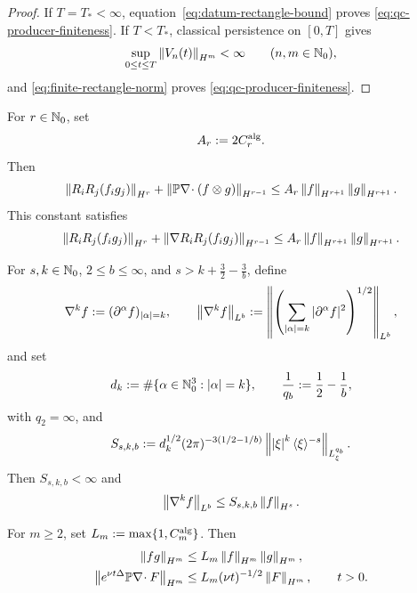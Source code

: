 \begin{proof}
If \(T=T_*<\infty\), equation~\eqref{eq:datum-rectangle-bound} proves
\eqref{eq:qc-producer-finiteness}.  If \(T<T_*\), classical persistence on
\([0,T]\) gives
\[
 \sup_{0\le t\le T}\left\lVert V_n(t)\right\rVert_{H^m}<\infty
 \qquad(n,m\in\mathbb N_0),
\]
and \eqref{eq:finite-rectangle-norm} proves
\eqref{eq:qc-producer-finiteness}.
\end{proof}

\begin{lemma}
\label{lem:qc-analytic-constants}
For \(r\in\mathbb N_0\), set
\[
 A_r:=2C_r^{\rm alg}.
\]
Then
\begin{equation}
 \left\lVert R_iR_j(f_i g_j)\right\rVert_{H^r}
 +\left\lVert \mathbb P\nabla\!\cdot(f\otimes g)\right\rVert_{H^{r-1}}
 \le A_r\left\lVert f\right\rVert_{H^{r+1}}\left\lVert g\right\rVert_{H^{r+1}}.
 \label{eq:qc-product-constant}
\end{equation}
This constant satisfies
\begin{equation}
 \left\lVert R_iR_j(f_i g_j)\right\rVert_{H^r}
 +\left\lVert \nabla R_iR_j(f_i g_j)\right\rVert_{H^{r-1}}
 \le A_r\left\lVert f\right\rVert_{H^{r+1}}\left\lVert g\right\rVert_{H^{r+1}}.
 \label{eq:qc-pressure-product-constant}
\end{equation}
\begin{samepage}
For \(s,k\in\mathbb N_0\), \(2\le b\le\infty\), and
\(s>k+\frac32-\frac3b\), define
\[
 \nabla^k f:=(\partial^\alpha f)_{|\alpha|=k},
 \qquad
 \left\lVert \nabla^k f\right\rVert_{L^b}
 :=\left\|\left(
   \sum_{|\alpha|=k}|\partial^\alpha f|^2
 \right)^{1/2}\right\|_{L^b},
\]
and set
\[
 d_k:=\#\{\alpha\in\mathbb N_0^3:\left|\alpha\right|=k\},
 \qquad
 \frac1{q_b}:=\frac12-\frac1b,
\]
with \(q_2=\infty\), and
\begin{equation}
 S_{s,k,b}:=
 d_k^{1/2}(2\pi)^{-3(1/2-1/b)}
 \left\lVert \left|\xi\right|^k\langle\xi\rangle^{-s}\right\rVert_{L^{q_b}_\xi}.
 \label{eq:qc-embedding-constant-definition}
\end{equation}
Then \(S_{s,k,b}<\infty\) and
\begin{equation}
 \left\lVert \nabla^k f\right\rVert_{L^b}\le S_{s,k,b}\left\lVert f\right\rVert_{H^s}.
 \label{eq:qc-embedding-constant}
\end{equation}
\par
\end{samepage}
For \(m\ge2\), set \(L_m:=\max\{1,C_m^{\rm alg}\}\).  Then
\begin{align}
 \left\lVert fg\right\rVert_{H^m}
 &\le L_m\left\lVert f\right\rVert_{H^m}\left\lVert g\right\rVert_{H^m},
 \label{eq:qc-algebra-constant}\\
 \left\lVert e^{\nu t\Delta}\mathbb P\nabla\!\cdot F\right\rVert_{H^m}
 &\le L_m(\nu t)^{-1/2}\left\lVert F\right\rVert_{H^m},
 \qquad t>0.
 \label{eq:qc-heat-constant}
\end{align}
\end{lemma}

